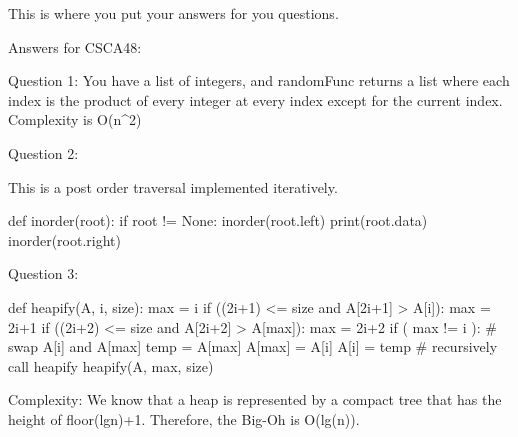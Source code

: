 \documentclass[12pt]{article}
\begin{document}
This is where you put your answers for you questions. 

Answers for CSCA48:

Question 1:
You have a list of integers, and randomFunc returns a list where each index  
is the product of every integer at every index except for the current index.
Complexity is O(n^2)

Question 2: 

This is a post order traversal implemented iteratively.
  
  def inorder(root):
    if root != None:
        inorder(root.left)
        print(root.data)
        inorder(root.right)

Question 3:

def heapify(A, i, size):
	max = i
	if ((2i+1) <= size and A[2i+1] > A[i]):
		max = 2i+1
	if ((2i+2) <= size and A[2i+2] > A[max]):
		max = 2i+2
	if ( max != i ):
		# swap A[i] and A[max]
		temp = A[max]
		A[max] = A[i]
		A[i] = temp
		# recursively call heapify
		heapify(A, max, size)

Complexity:
We know that a heap is represented by a compact tree that has the height of floor(lgn)+1.
Therefore, the Big-Oh is O(lg(n)).
\end{document}
